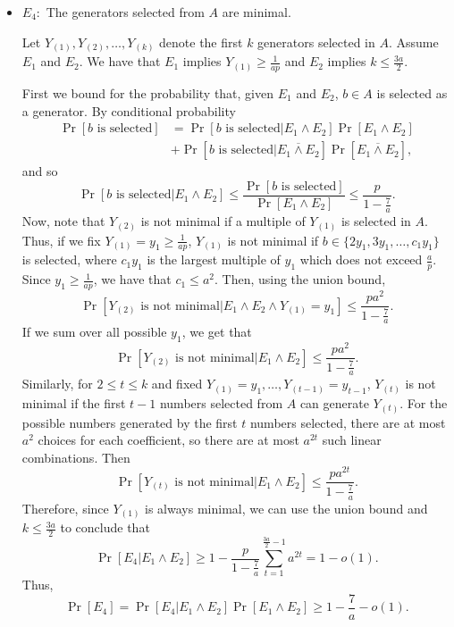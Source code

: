 \begin{itemize}
    \item $E_4:$ The generators selected from $A$ are minimal.\par 
    Let $Y_{(1)}, Y_{(2)}, \ldots, Y_{(k)}$ denote the first $k$ generators selected in $A$. Assume $E_1$ and $E_2$. We have that $E_1$ implies $Y_{(1)} \geq \frac{1}{ap}$ and $E_2$ implies $k \leq \frac{3a}{2}$. \par
    First we bound for the probability that, given $E_1$ and $E_2$, $b \in A$ is selected as a generator. By conditional probability 
    \begin{align*}
        \Pr[b \text{ is selected}] &= \Pr[b \text{ is selected}|E_1 \land E_2]\Pr[E_1 \land E_2]  \\
        &+  \Pr[b \text{ is selected}|\overline{E_1 \land E_2}]\Pr[\overline{E_1 \land E_2}],
    \end{align*}
    and so
    \[\Pr[b \text{ is selected}|E_1 \land E_2] \leq \frac{\Pr[b \text{ is selected}]}{\Pr[E_1 \land E_2]} \leq  \frac{p}{1 - \frac{7}{a}}.  \] 
    Now, note that $Y_{(2)}$ is not minimal if a multiple of $Y_{(1)}$ is selected in $A$. Thus, if we fix $Y_{(1)} = y_1 \geq \frac{1}{ap}$, $Y_{(1)}$ is not minimal if $b \in \{2y_1, 3y_1, \ldots, c_1y_1\}$ is selected, where $c_1y_1$ is the largest multiple of $y_1$ which does not exceed $\frac{a}{p}$. Since $y_1 \geq \frac{1}{ap}$, we have that $c_1 \leq a^2$. Then, using the union bound, 
    \[\Pr[Y_{(2)} \text{ is not minimal}|E_1\land E_2 \land Y_{(1)} = y_1] \leq \frac{pa^2}{1 - \frac{7}{a}} .\]
    If we sum over all possible $y_1$, we get that 
    \[\Pr[Y_{(2)} \text{ is not minimal}|E_1\land E_2] \leq \frac{pa^2}{1 - \frac{7}{a}} .\]
    Similarly, for $2 \leq t \leq k$ and fixed $Y_{(1)} = y_1, \ldots, Y_{(t - 1)} = y_{t - 1}$, $Y_{(t)}$ is not minimal if the first $t - 1$ numbers selected from $A$ can generate $Y_{(t)}$. For the possible numbers generated by the first $t$ numbers selected, there are at most $a^2$ choices for each coefficient, so there are at most $a^{2t}$ such linear combinations. Then 
    \[\Pr[Y_{(t)} \text{ is not minimal}|E_1\land E_2] \leq \frac{pa^{2t}}{1 - \frac{7}{a}} .\]
    Therefore, since $Y_{(1)}$ is always minimal, we can use the union bound and $k \leq \frac{3a}{2}$ to conclude that
    \[\Pr[E_4|E_1 \land E_2] \geq 1 - \frac{p}{1 - \frac{7}{a}}\sum_{t = 1}^{\frac{3a}{2} - 1}a^{2t} = 1 - o(1).\]
    Thus,  
    \[\Pr[E_4] = \Pr[E_4| E_1 \land E_2]\Pr[E_1\land E_2] \geq 1 - \frac{7}{a} - o(1).\] 
\end{itemize}


